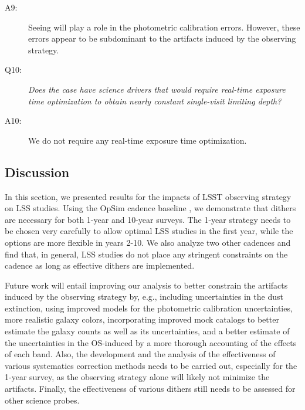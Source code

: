 \begin{description}
\item[A9:] Seeing will play a role in the photometric calibration
errors. However, these errors appear to be subdominant to the artifacts
induced by the observing strategy.

\item[Q10:] {\it Does the case have science drivers that would require
real-time exposure time optimization to obtain nearly constant
single-visit limiting depth?}

\item[A10:] We do not require any real-time exposure time optimization.

\end{description}

\subsection{Discussion}
\label{sec:\secname:discussion}

In this section, we presented results for the impacts of LSST observing
strategy on LSS studies. Using the OpSim cadence baseline
, we demonstrate that dithers are necessary
for both 1-year and 10-year surveys. The 1-year strategy needs to be
chosen very carefully to allow optimal LSS studies in the first year,
while the options are more flexible in years 2-10. We also analyze two
other cadences and find that, in general, LSS studies do not place any
stringent constraints on the cadence as long as effective dithers are
implemented.

Future work will entail improving our analysis to better constrain the
artifacts induced by the observing strategy by, e.g., including
uncertainties in the dust extinction, using improved models for the
photometric calibration uncertainties, more realistic galaxy colors,
incorporating improved mock catalogs to better estimate the galaxy
counts as well as its uncertainties, and a better estimate of the
uncertainties in the OS-induced by a more thorough accounting of the
effects of each band. Also, the development and the analysis of the
effectiveness of various systematics correction methods needs to be
carried out, especially for the 1-year survey, as the observing strategy
alone will likely not minimize the artifacts. Finally, the effectiveness
of various dithers still needs to be assessed for other science probes.


\navigationbar

